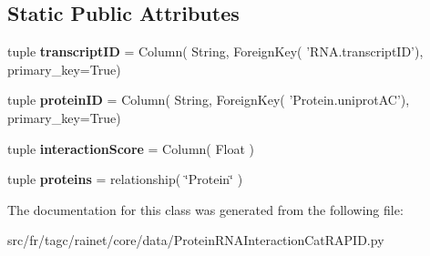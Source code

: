 \subsection*{Static Public Attributes}
\begin{DoxyCompactItemize}
\item 
\hypertarget{classsrc_1_1fr_1_1tagc_1_1rainet_1_1core_1_1data_1_1ProteinRNAInteractionCatRAPID_1_1ProteinRNAInteractionCatRAPID_a77b5c288ada86d622c96ce803ef5a4a5}{tuple {\bfseries transcript\-I\-D} = Column( String, Foreign\-Key( 'R\-N\-A.\-transcript\-I\-D'), primary\-\_\-key=True)}\label{classsrc_1_1fr_1_1tagc_1_1rainet_1_1core_1_1data_1_1ProteinRNAInteractionCatRAPID_1_1ProteinRNAInteractionCatRAPID_a77b5c288ada86d622c96ce803ef5a4a5}

\item 
\hypertarget{classsrc_1_1fr_1_1tagc_1_1rainet_1_1core_1_1data_1_1ProteinRNAInteractionCatRAPID_1_1ProteinRNAInteractionCatRAPID_a2149aedbb08557743b279c9a9f775ce5}{tuple {\bfseries protein\-I\-D} = Column( String, Foreign\-Key( 'Protein.\-uniprot\-A\-C'), primary\-\_\-key=True)}\label{classsrc_1_1fr_1_1tagc_1_1rainet_1_1core_1_1data_1_1ProteinRNAInteractionCatRAPID_1_1ProteinRNAInteractionCatRAPID_a2149aedbb08557743b279c9a9f775ce5}

\item 
\hypertarget{classsrc_1_1fr_1_1tagc_1_1rainet_1_1core_1_1data_1_1ProteinRNAInteractionCatRAPID_1_1ProteinRNAInteractionCatRAPID_aacb4a3db881b681d85247765f422bc9f}{tuple {\bfseries interaction\-Score} = Column( Float )}\label{classsrc_1_1fr_1_1tagc_1_1rainet_1_1core_1_1data_1_1ProteinRNAInteractionCatRAPID_1_1ProteinRNAInteractionCatRAPID_aacb4a3db881b681d85247765f422bc9f}

\item 
\hypertarget{classsrc_1_1fr_1_1tagc_1_1rainet_1_1core_1_1data_1_1ProteinRNAInteractionCatRAPID_1_1ProteinRNAInteractionCatRAPID_ae7b32d61ba0f640c6d059c4fb78f6fbc}{tuple {\bfseries proteins} = relationship( \char`\"{}Protein\char`\"{} )}\label{classsrc_1_1fr_1_1tagc_1_1rainet_1_1core_1_1data_1_1ProteinRNAInteractionCatRAPID_1_1ProteinRNAInteractionCatRAPID_ae7b32d61ba0f640c6d059c4fb78f6fbc}

\end{DoxyCompactItemize}


The documentation for this class was generated from the following file\-:\begin{DoxyCompactItemize}
\item 
src/fr/tagc/rainet/core/data/Protein\-R\-N\-A\-Interaction\-Cat\-R\-A\-P\-I\-D.\-py\end{DoxyCompactItemize}
